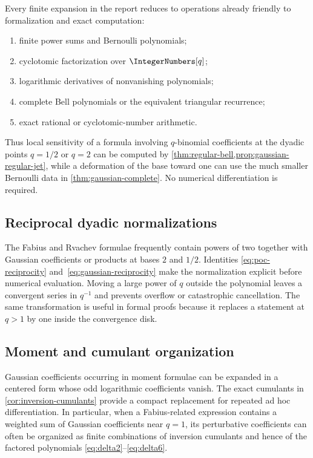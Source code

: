 \documentclass[11pt,oneside]{article}
\theoremstyle{definition}
\theoremstyle{remark}
\let\reportsubsection\subsection
\let\section\reportsubsection
\begin{document}
Every finite expansion in the report reduces to operations already friendly to
formalization and exact computation:

\begin{enumerate}[label=\textup{(\alph*)}]
\item finite power sums and Bernoulli polynomials;
\item cyclotomic factorization over $\IntegerNumbers[q]$;
\item logarithmic derivatives of nonvanishing polynomials;
\item complete Bell polynomials or the equivalent triangular recurrence;
\item exact rational or cyclotomic-number arithmetic.
\end{enumerate}

Thus local sensitivity of a formula involving $q$-binomial coefficients at the
dyadic points $q=1/2$ or $q=2$ can be computed by
\cref{thm:regular-bell,prop:gaussian-regular-jet}, while a deformation of the
base toward one can use the much smaller Bernoulli data in
\cref{thm:gaussian-complete}.  No numerical differentiation is required.

\section{Reciprocal dyadic normalizations}

The Fabius and Rvachev formulae frequently contain powers of two together with
Gaussian coefficients or products at bases $2$ and $1/2$.  Identities
\eqref{eq:poc-reciprocity} and~\eqref{eq:gaussian-reciprocity} make the
normalization explicit before numerical evaluation.  Moving a large power of
$q$ outside the polynomial leaves a convergent series in $q^{-1}$ and prevents
overflow or catastrophic cancellation.  The same transformation is useful in
formal proofs because it replaces a statement at $q>1$ by one inside the
convergence disk.

\section{Moment and cumulant organization}

Gaussian coefficients occurring in moment formulae can be expanded in a
centered form whose odd logarithmic coefficients vanish.  The exact cumulants
in \cref{cor:inversion-cumulants} provide a compact replacement for repeated
ad hoc differentiation.  In particular, when a Fabius-related expression
contains a weighted sum of Gaussian coefficients near $q=1$, its perturbative
coefficients can often be organized as finite combinations of inversion
cumulants and hence of the factored polynomials
\eqref{eq:delta2}--\eqref{eq:delta6}.
\end{document}
